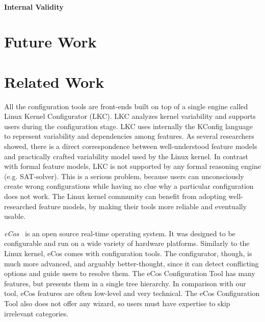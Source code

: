 \documentclass{chi2009}
\newcommand{\todo}[1]{\textsf{\textbf{\textcolor{Orange}{[[#1]]}}}}
\begin{document}
\paragraph{Internal Validity}

\section{Future Work}\label{sec:futurework}



\section{Related Work}\label{sec:relatedwork}

All the configuration tools are front-ends built on top of a single engine called Linux Kernel Configurator (LKC). LKC analyzes kernel variability and supports users during the configuration stage. LKC uses internally the KConfig language to represent variability and dependencies among features. As several researchers \cite{sincero:lkc:2008,she:kernel:2010} showed, there is a direct correspondence between well-understood feature models and practically crafted variability model used by the Linux kernel. In contrast with formal feature models, LKC is not supported by any formal reasoning engine (e.g. SAT-solver). This is a serious problem, because users can unconsciously create wrong configurations while having no clue why a particular configuration does not work. The Linux kernel community can benefit from adopting well-researched feature models, by making their tools more reliable and eventually usable.

\textit{eCos}~\cite{veer:ecos:2000} is an open source real-time operating system. It was designed to be configurable and run on a wide variety of hardware platforms. Similarly to the Linux kernel, eCos comes with configuration tools. The configurator, though, is much more advanced, and arguably better-thought, since it can detect conflicting options and guide users to resolve them. The eCos Configuration Tool has many features, but presents them in a single tree hierarchy. In comparison with our tool, eCos features are often low-level and very technical. The eCos Configuration Tool also does not offer any wizard, so users must have expertise to skip irrelevant categories.
\end{document}
